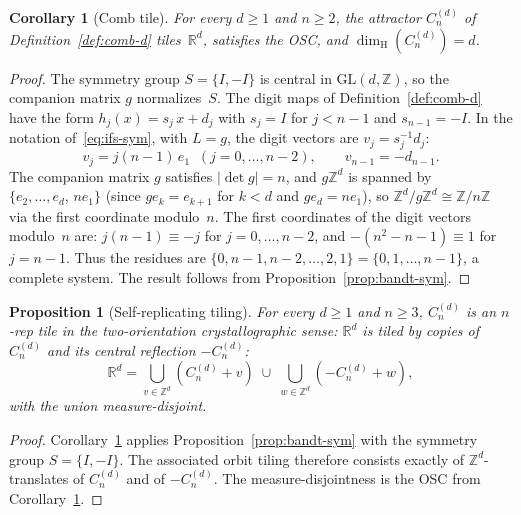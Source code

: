 \documentclass{amsart}
\newtheorem{proposition}[theorem]{Proposition}
\newtheorem{corollary}[theorem]{Corollary}
\theoremstyle{definition}
\theoremstyle{remark}
\newcommand{\R}{\mathbb{R}}
\newcommand{\Z}{\mathbb{Z}}
\newcommand{\dH}{\dim_{\mathrm{H}}}
\begin{document}
\begin{corollary}[Comb tile]\label{cor:comb-tile}
For every $d \ge 1$ and $n \ge 2$, the attractor $C_n^{(d)}$
of Definition~\ref{def:comb-d} tiles~$\R^d$, satisfies the OSC,
and $\dH(C_n^{(d)}) = d$.
\end{corollary}

\begin{proof}
The symmetry group $S = \{I,-I\}$ is central in $\mathrm{GL}(d,\Z)$,
so the companion matrix $g$ normalizes~$S$.
The digit maps of Definition~\ref{def:comb-d} have the form
$h_j(x) = s_j\,x + d_j$ with $s_j = I$ for $j < n{-}1$
and $s_{n-1} = -I$.
In the notation of~\eqref{eq:ifs-sym}, with $L = g$, the digit vectors are
$v_j = s_j^{-1}d_j$:
\[
  v_j = j(n{-}1)\,e_1 \;\;(j = 0,\ldots,n{-}2),
  \qquad
  v_{n-1} = -d_{n-1}.
\]
The companion matrix $g$ satisfies $|\det g| = n$,
and $g\Z^d$ is spanned by $\{e_2,\ldots,e_d,\,ne_1\}$
(since $ge_k = e_{k+1}$ for $k < d$ and $ge_d = ne_1$),
so $\Z^d/g\Z^d \cong \Z/n\Z$ via the first coordinate modulo~$n$.
The first coordinates of the digit vectors modulo~$n$ are:
$j(n{-}1) \equiv -j$ for $j = 0,\ldots,n{-}2$,
and $-(n^2{-}n{-}1) \equiv 1$ for $j = n{-}1$.
Thus the residues are
$\{0, n{-}1, n{-}2, \ldots, 2, 1\} = \{0,1,\ldots,n{-}1\}$,
a complete system.
The result follows from Proposition~\ref{prop:bandt-sym}.
\end{proof}

\begin{proposition}[Self-replicating tiling]\label{prop:tiling}
For every $d \ge 1$ and $n \ge 3$, $C_n^{(d)}$ is an $n$-rep tile
in the two-orientation crystallographic sense: $\R^d$ is tiled by
copies of $C_n^{(d)}$ and its central reflection $-C_n^{(d)}$:
\[
  \R^d = \bigcup_{v \in \Z^d} (C_n^{(d)} + v)
         \;\cup\; \bigcup_{w \in \Z^d} (-C_n^{(d)} + w),
\]
with the union measure-disjoint.
\end{proposition}

\begin{proof}
Corollary~\ref{cor:comb-tile} applies Proposition~\ref{prop:bandt-sym}
with the symmetry group $S = \{I,-I\}$.  The associated orbit tiling
therefore consists exactly of $\Z^d$-translates of $C_n^{(d)}$ and
of $-C_n^{(d)}$.  The measure-disjointness is the OSC from
Corollary~\ref{cor:comb-tile}.
\end{proof}

\end{document}
